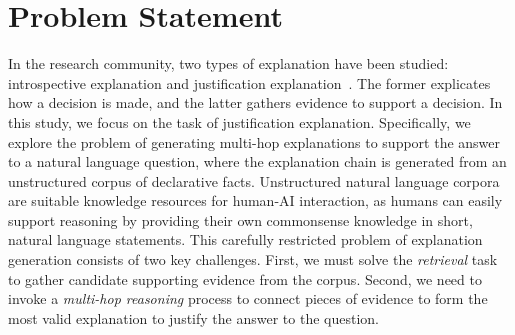 \documentclass[letterpaper]{article} %
\begin{document}
\section{Problem Statement}
In the research community, two types of explanation have been studied: introspective explanation and justification explanation~\cite{biran2017explanation}. The former explicates how a decision is made, and the latter gathers evidence to support a decision. In this study, we focus on the task of justification explanation. Specifically, we explore the problem of generating multi-hop explanations to support the answer to a natural language question, where the explanation chain is generated from an unstructured corpus of declarative facts. Unstructured natural language corpora are suitable knowledge resources for human-AI interaction, as humans can easily support reasoning by providing their own commonsense knowledge in short, natural language statements. This carefully restricted problem of explanation generation consists of two key challenges. First, we must solve the \textit{retrieval} task to gather candidate supporting evidence from the corpus. Second, we need to invoke a \textit{multi-hop reasoning} process to connect pieces of evidence to form the most valid explanation to justify the answer to the question.





\end{document}
